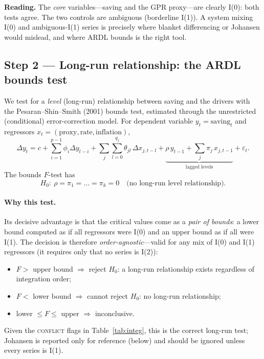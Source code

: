 \documentclass[11pt,a4paper]{article}
\begin{document}
\noindent\textbf{Reading.} The \emph{core} variables---saving and the GPR
proxy---are clearly I(0): both tests agree. The two controls are ambiguous
(borderline I(1)). A system mixing I(0) and ambiguous-I(1) series is precisely
where blanket differencing or Johansen would mislead, and where ARDL bounds is
the right tool.

\subsection{Step 2 --- Long-run relationship: the ARDL bounds test}
We test for a \emph{level} (long-run) relationship between saving and the drivers
with the Pesaran--Shin--Smith (2001) bounds test, estimated through the
unrestricted (conditional) error-correction model. For dependent variable
$y_t=\text{saving}_t$ and regressors $x_t=(\text{proxy},\text{rate},
\text{inflation})$,
\begin{equation}
  \Delta y_t = c
    + \sum_{i=1}^{p-1}\phi_i \Delta y_{t-i}
    + \sum_{j}\sum_{l=0}^{q_j}\theta_{j l}\,\Delta x_{j,t-l}
    + \underbrace{\rho\,y_{t-1} + \sum_{j}\pi_j\,x_{j,t-1}}_{\text{lagged levels}}
    + \varepsilon_t .
  \label{eq:uecm}
\end{equation}
The bounds $F$-test has
\begin{equation}
  H_0:\ \rho = \pi_1 = \dots = \pi_k = 0
  \quad\text{(no long-run level relationship).}
\end{equation}

\paragraph{Why this test.} Its decisive advantage is that the critical values
come as a \emph{pair of bounds}: a lower bound computed as if all regressors were
I(0) and an upper bound as if all were I(1). The decision is therefore
\emph{order-agnostic}---valid for any mix of I(0) and I(1) regressors (it
requires only that no series is I(2)):
\begin{itemize}
  \item $F >$ upper bound $\Rightarrow$ reject $H_0$: a long-run relationship
  exists regardless of integration order;
  \item $F <$ lower bound $\Rightarrow$ cannot reject $H_0$: no long-run
  relationship;
  \item lower $\le F \le$ upper $\Rightarrow$ inconclusive.
\end{itemize}
Given the \textsc{conflict} flags in Table~\ref{tab:integ}, this is the correct
long-run test; Johansen is reported only for reference (below) and should be
ignored unless every series is I(1).
\end{document}
